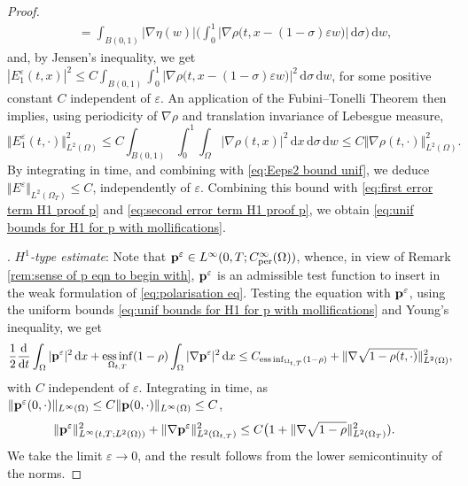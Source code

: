 \documentclass[10pt,a4paper]{amsart}
\renewcommand{\d}{\, \mathrm{d} }
\newcommand{\der}{\mathrm{d}}
\DeclareMathOperator{\essinf}{ess \, inf}
\newcommand{\p}{{\bf p}}
\newcommand{\per}{\mathrm{per}}
\begin{document}
\begin{proof}
\begin{equation*}
\begin{aligned}
        &= \int_{B(0,1)} |\nabla \eta (w)| \bigg(  \int_0^1 |\nabla \rho \big(t, x - (1-\sigma)\varepsilon w \big)| \d \sigma\bigg) \d w, 
    \end{aligned}
\end{equation*}
and, by Jensen's inequality, we get $|E^\varepsilon_1(t,x)|^2 \leq C \int_{B(0,1)} \int_0^1 |\nabla \rho \big(t, x - (1-\sigma)\varepsilon w \big)|^2 \d \sigma \d w$, for some positive constant $C$ independent of $\varepsilon$. An application of the Fubini--Tonelli Theorem then implies, using periodicity of $\nabla \rho$ and translation invariance of Lebesgue measure, 
\begin{equation*}
    \Vert E^\varepsilon_1(t,\cdot) \Vert^2_{L^2(\Omega)} \leq C \int_{B(0,1)} \int_0^1 \int_\Omega |\nabla \rho(t,x)|^2 \d x \d \sigma \d w \leq C \Vert \nabla \rho(t,\cdot) \Vert^2_{L^2(\Omega)}. 
\end{equation*}
By integrating in time, and combining with \eqref{eq:Eeps2 bound unif}, we deduce $\Vert E^\varepsilon \Vert_{L^2(\Omega_T)} \leq C$, independently of $\varepsilon$. Combining this bound with \eqref{eq:first error term H1 proof p} and \eqref{eq:second error term H1 proof p}, we obtain \eqref{eq:unif bounds for H1 for p with mollifications}. 

\smallskip 

    . \textit{$H^1$-type estimate}: Note that $\p^\varepsilon \in L^\infty(0,T;C^\infty_{\per}(\Omega))$, whence, in view of Remark \ref{rem:sense of p eqn to begin with}, $\p^\varepsilon$ is an admissible test function to insert in the weak formulation of \eqref{eq:polarisation eq}. Testing the equation with $\p^\varepsilon$, using the uniform bounds \eqref{eq:unif bounds for H1 for p with mollifications} and Young's inequality, we get 
    \begin{equation*}
        \begin{aligned}
            \frac{1}{2}\frac{\der}{\der t}\int_\Omega |\p^\varepsilon|^2 \d x + \essinf_{\Omega_{t,T}}(1-\rho) \int_\Omega |\nabla \p^\varepsilon|^2 \d x \leq C_{\essinf_{\Omega_{t,T}}(1-\rho)} + \Vert \nabla \sqrt{1-\rho(t,\cdot)} \Vert^2_{L^2(\Omega)} , 
        \end{aligned}
    \end{equation*}
with $C$ independent of $\varepsilon$. Integrating in time, as $\Vert \p^\varepsilon(0,\cdot)\Vert_{L^\infty(\Omega)} \leq C \Vert \p(0,\cdot)\Vert_{L^\infty(\Omega)} \leq C$, 
    \begin{equation}\label{eq:just before H1 final bound for p}
        \begin{aligned}
            \Vert \p^\varepsilon\Vert_{L^\infty(t,T;L^2(\Omega))}^2 + \Vert \nabla \p^\varepsilon\Vert_{L^2(\Omega_{t,T})}^2 &\leq C\big( 1+ \Vert \nabla \sqrt{1-\rho} \Vert^2_{L^2(\Omega_T)}). 
        \end{aligned}
    \end{equation}
    We take the limit $\varepsilon \to 0$, and the result follows from the lower semicontinuity of the norms. 
    

\end{proof}
\end{document}
